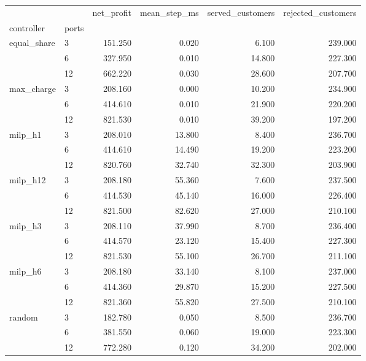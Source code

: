 \begin{tabular}{llrrrr}
\toprule
 &  & net_profit & mean_step_ms & served_customers & rejected_customers \\
controller & ports &  &  &  &  \\
\midrule
\multirow[t]{3}{*}{equal_share} & 3 & 151.250 & 0.020 & 6.100 & 239.000 \\
 & 6 & 327.950 & 0.010 & 14.800 & 227.300 \\
 & 12 & 662.220 & 0.030 & 28.600 & 207.700 \\
\cline{1-6}
\multirow[t]{3}{*}{max_charge} & 3 & 208.160 & 0.000 & 10.200 & 234.900 \\
 & 6 & 414.610 & 0.010 & 21.900 & 220.200 \\
 & 12 & 821.530 & 0.010 & 39.200 & 197.200 \\
\cline{1-6}
\multirow[t]{3}{*}{milp_h1} & 3 & 208.010 & 13.800 & 8.400 & 236.700 \\
 & 6 & 414.610 & 14.490 & 19.200 & 223.200 \\
 & 12 & 820.760 & 32.740 & 32.300 & 203.900 \\
\cline{1-6}
\multirow[t]{3}{*}{milp_h12} & 3 & 208.180 & 55.360 & 7.600 & 237.500 \\
 & 6 & 414.530 & 45.140 & 16.000 & 226.400 \\
 & 12 & 821.500 & 82.620 & 27.000 & 210.100 \\
\cline{1-6}
\multirow[t]{3}{*}{milp_h3} & 3 & 208.110 & 37.990 & 8.700 & 236.400 \\
 & 6 & 414.570 & 23.120 & 15.400 & 227.300 \\
 & 12 & 821.530 & 55.100 & 26.700 & 211.100 \\
\cline{1-6}
\multirow[t]{3}{*}{milp_h6} & 3 & 208.180 & 33.140 & 8.100 & 237.000 \\
 & 6 & 414.360 & 29.870 & 15.200 & 227.500 \\
 & 12 & 821.360 & 55.820 & 27.500 & 210.100 \\
\cline{1-6}
\multirow[t]{3}{*}{random} & 3 & 182.780 & 0.050 & 8.500 & 236.700 \\
 & 6 & 381.550 & 0.060 & 19.000 & 223.300 \\
 & 12 & 772.280 & 0.120 & 34.200 & 202.000 \\
\cline{1-6}
\bottomrule
\end{tabular}
